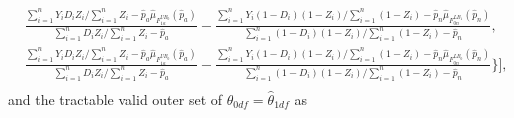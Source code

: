 \documentclass[12pt]{article}
\theoremstyle{plain}
\theoremstyle{definition}
\theoremstyle{remark}
\begin{document}
\begin{equation*}
\begin{aligned}
         & \frac{\sum_{i=1}^{n}Y_i D_i Z_i / \sum_{i=1}^{n} Z_i - \hat{p}_a \hat{\mu}_{F_{1a}^{UB_0}}(\hat{p}_a)}{\sum_{i=1}^{n} D_i Z_i / \sum_{i=1}^{n} Z_i-\hat{p}_a}-\frac{\sum_{i=1}^{n} Y_i (1-D_i) (1-Z_i) / \sum_{i=1}^{n}(1-Z_i)-\hat{p}_n \hat{\mu}_{F_{0n}^{LB_1}}\left(\hat{p}_n\right)}{\sum_{i=1}^{n} (1-D_i) (1-Z_i) / \sum_{i=1}^{n} (1-Z_i) - \hat{p}_n}, \\ 
         & \frac{\sum_{i=1}^{n}Y_i D_i Z_i / \sum_{i=1}^{n} Z_i - \hat{p}_a \hat{\mu}_{F_{1a}^{UB_0}}(\hat{p}_a)}{\sum_{i=1}^{n} D_i Z_i / \sum_{i=1}^{n} Z_i-\hat{p}_a}-\frac{\sum_{i=1}^{n} Y_i (1-D_i) (1-Z_i) / \sum_{i=1}^{n}(1-Z_i)-\hat{p}_n \hat{\mu}_{F_{0n}^{LB_0}}\left(\hat{p}_n\right)}{\sum_{i=1}^{n} (1-D_i) (1-Z_i) / \sum_{i=1}^{n} (1-Z_i) - \hat{p}_n} \Bigg\} \Bigg], \\
    \end{aligned}
\end{equation*}
and the tractable valid outer set of $\hat{\theta}_{0 df}=\hat{\theta}_{1 df}$ as 
\end{document}
